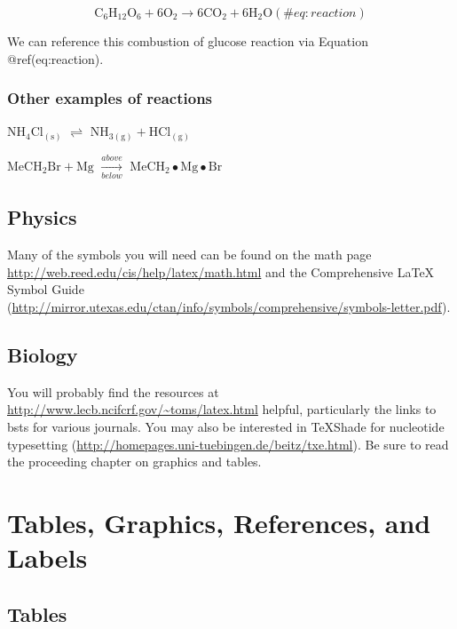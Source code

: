 \documentclass[
  letterpaper,
  12pt,
  twoside]{book}
\begin{document}
\begin{equation}
  \mathrm{C_6H_{12}O_6  + 6O_2} \longrightarrow \mathrm{6CO_2 + 6H_2O}
  (\#eq:reaction)
\end{equation}

We can reference this combustion of glucose reaction via Equation
@ref(eq:reaction).

\subsection{Other examples of
reactions}\label{other-examples-of-reactions}

\(\mathrm{NH_4Cl_{(s)}}\) \(\rightleftharpoons\)
\(\mathrm{NH_{3(g)}+HCl_{(g)}}\)

\noindent \(\mathrm{MeCH_2Br + Mg}\) \(\xrightarrow[below]{above}\)
\(\mathrm{MeCH_2\bullet Mg \bullet Br}\)

\section{Physics}\label{physics}

Many of the symbols you will need can be found on the math page
\url{http://web.reed.edu/cis/help/latex/math.html} and the Comprehensive
LaTeX Symbol Guide
(\url{http://mirror.utexas.edu/ctan/info/symbols/comprehensive/symbols-letter.pdf}).

\section{Biology}\label{biology}

You will probably find the resources at
\url{http://www.lecb.ncifcrf.gov/~toms/latex.html} helpful, particularly
the links to bsts for various journals. You may also be interested in
TeXShade for nucleotide typesetting
(\url{http://homepages.uni-tuebingen.de/beitz/txe.html}). Be sure to
read the proceeding chapter on graphics and tables.


\chapter{Tables, Graphics, References, and Labels}\label{ref-labels}

\section{Tables}\label{tables}
\end{document}
